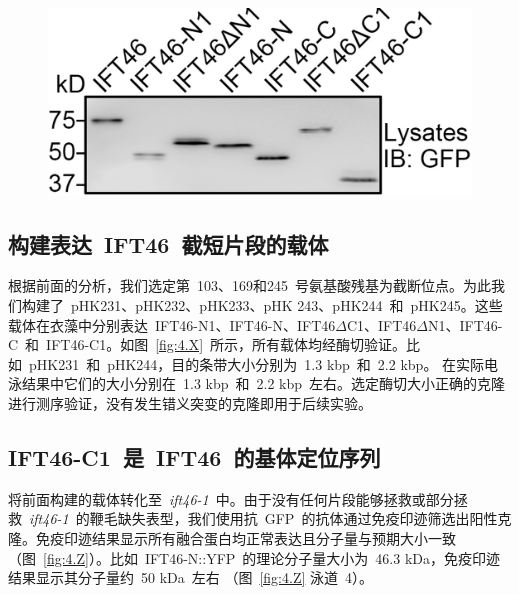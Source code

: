 \begin{figure}[htbp!]
\centering
\graphicspath{{figures/}}
\includegraphics[width=\textwidth-80mm]{fig4-Z.jpg}
{
\par}
\end{figure}

\subsection{构建表达\ IFT46\ 截短片段的载体}
根据前面的分析，我们选定第\ 103、169和245\ 号氨基酸残基为截断位点。为此我们构建了\ pHK231、pHK232、pHK233、pHK
243、pHK244\ 和\ pHK245。这些载体在衣藻中分别表达\ IFT46-N1、IFT46-N、IFT46$\Delta$C1、IFT46$\Delta$N1、IFT46-C\ 和\ IFT46-C1。如图\ \ref{fig:4.X}\ 所示，所有载体均经酶切验证。比如\ pHK231\ 和\ pHK244，目的条带大小分别为\ 1.3 kbp\ 和\ 2.2 kbp。 在实际电泳结果中它们的大小分别在\ 1.3 kbp\ 和\ 2.2 kbp\ 左右。选定酶切大小正确的克隆进行测序验证，没有发生错义突变的克隆即用于后续实验。

\subsection{IFT46-C1\ 是\ IFT46\ 的基体定位序列}
将前面构建的载体转化至\ \textit{ift46-1}\ 中。由于没有任何片段能够拯救或部分拯救\ \textit{ift46-1}\ 的鞭毛缺失表型，我们使用抗\ GFP\ 的抗体通过免疫印迹筛选出阳性克隆。免疫印迹结果显示所有融合蛋白均正常表达且分子量与预期大小一致
（图\ \ref{fig:4.Z}）。比如\ IFT46-N::YFP\ 的理论分子量大小为\ 46.3 kDa，免疫印迹结果显示其分子量约\ 50 kDa\ 左右
（图\ \ref{fig:4.Z} 泳道\ 4）。

